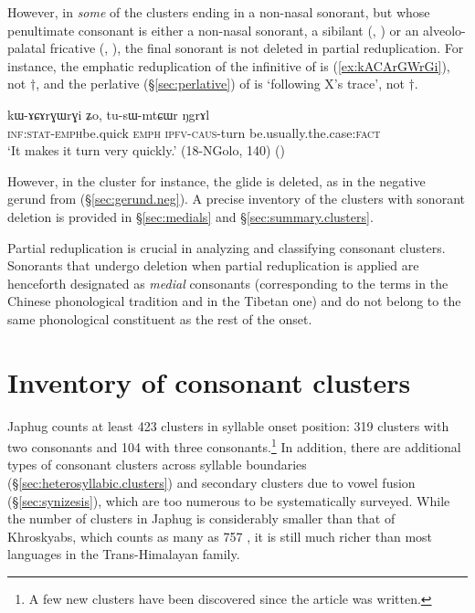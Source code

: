 However, in \textit{some} of the clusters ending in a non-nasal sonorant, but whose penultimate consonant is either a non-nasal sonorant, a sibilant (, ) or an alveolo-palatal fricative (, ), the final sonorant is not deleted in partial reduplication. For instance, the emphatic reduplication of the infinitive of  is  (\ref{ex:kACArGWrGi}), not $\dagger$, and the perlative (§\ref{sec:perlative}) of  is   `following X's trace', not $\dagger$.

\begin{exe}
	\ex \label{ex:kACArGWrGi}
	\gll kɯ-ɤɕɤrɣɯ\redp{}rɣi ʑo, tu-sɯ-mtɕɯr ŋgrɤl \\
	\textsc{inf}:\textsc{stat}-\textsc{emph}\redp{}be.quick \textsc{emph} \textsc{ipfv}-\textsc{caus}-turn be.usually.the.case:\textsc{fact} \\
	\glt `It makes it turn very quickly.' (18-NGolo, 140)
	()
\end{exe}

However, in the cluster  for instance, the glide  is deleted, as in the negative gerund  from  (§\ref{sec:gerund.neg}). A precise inventory of the clusters with sonorant deletion is provided in  §\ref{sec:medials}  and §\ref{sec:summary.clusters}.


Partial reduplication is crucial in analyzing and classifying consonant clusters. Sonorants that undergo deletion when partial reduplication is applied are henceforth designated as \textit{medial} consonants (corresponding to the terms  in the Chinese phonological tradition and  in the Tibetan one) and do not belong to the same phonological constituent as the rest of the onset.  


\section{Inventory of consonant clusters} \label{sec:inventory.clusters}
Japhug counts at least 423 clusters in syllable onset position:  319 clusters with two consonants and 104 with three consonants.\footnote{A few new clusters have been discovered since the article \citet{jacques19ipa} was written. } In addition, there are additional types of consonant clusters across syllable boundaries (§\ref{sec:heterosyllabic.clusters}) and secondary clusters due to vowel fusion (§\ref{sec:synizesis}), which are too numerous to be systematically surveyed. While the number of clusters in Japhug is considerably smaller than that of Khroskyabs, which counts as many as 757 \citep[101]{lai17khroskyabs}, it is still much richer than most languages in the Trans-Himalayan family. 

